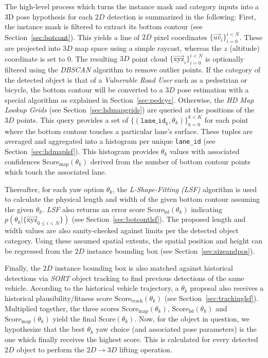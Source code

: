 The high-level process which turns the instance mask and category inputs into a 3D pose hypothesis for each $2D$ detection is summarized in the following:
First, the instance mask is filtered to extract its bottom contour (see Section~\ref{sec:botcont}).
This yields a line of $2D$ pixel coordinates $\{\overrightarrow{uv}_i\}_{i=0}^{i < N}$.
These are projected into $3D$ map space using a simple raycast, whereas the $z$ (altitude) coordinate is set to 0.
The resulting $3D$ point cloud $\{\overrightarrow{\text{xyz}}_i\}_{i=0}^{i < N}$ is optionally filtered using the \textit{DBSCAN} algorithm to remove outlier points.
If the category of the detected object is that of a \textit{Vulnerable Road User} such as a pedestrian or bicycle, the bottom contour will be converted to a $3D$ pose estimation with a special algorithm as explained in Section~\ref{sec:pedcyc}.
Otherwise, the \textit{HD Map Lookup Grids} (see Section~\ref{sec:hdmapgrids}) are queried at the positions of the $3D$ points.
This query provides a set of $\{(\mathtt{lane\_id}_k, \theta_k)\}_{k=0}^{k<K}$ for each point where the bottom contour touches a particular lane's surface.
These tuples are averaged and aggregated into a histogram per unique \texttt{lane\_id} (see Section~\ref{sec:hdmaplsf}).
This histogram provides $\theta_k$ values with associated confidences $\text{Score}_\text{map}(\theta_k)$ derived from the number of bottom contour points which touch the associated lane.

Thereafter, for each yaw option $\theta_k$, the \textit{L-Shape-Fitting (LSF)} algorithm is used to calculate the physical length and width of the given bottom contour assuming the given $\theta_k$. \textit{LSF} also returns an error score $\text{Score}_\text{lsf}(\theta_k)$ indicating $p(\theta_k|\{\overrightarrow{\text{xyz}}_{0 \leq i < N}\})$ (see Section~\ref{sec:botcontlsf}).
The proposed length and width values are also sanity-checked against limits per the detected object category.
Using these assumed spatial extents, the spatial position and height can be regressed from the $2D$ instance bounding box (see Section~\ref{sec:sizeandpos}).

Finally, the $2D$ instance bounding box is also matched against historical detections via \textit{SORT} object tracking to find previous detections of the same vehicle.
According to the historical vehicle trajectory, a $\theta_k$ proposal also receives a historical plausibility/fitness score $\text{Score}_\text{track}(\theta_k)$ (see Section~\ref{sec:trackinglsf}).
Multiplied together, the three scores $\text{Score}_\text{map}(\theta_k)$, $\text{Score}_\text{lsf}(\theta_k)$ and $\text{Score}_\text{map}(\theta_k)$ yield the final $\text{Score}(\theta_k)$.
Now, for the object in question, we hypothesize that the best $\theta_k$ yaw choice (and associated pose parameters) is the one which finally receives the highest score.
This is calculated for every detected $2D$ object to perform the $2D \rightarrow 3D$ lifting operation.


